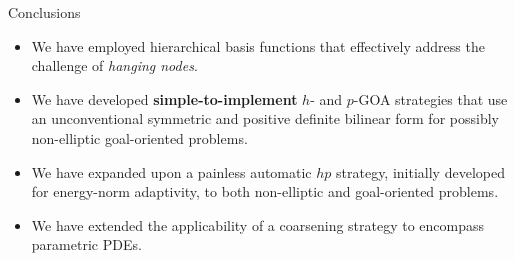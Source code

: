 \begin{frame}{Conclusions}

\begin{itemize}
\item We have employed hierarchical basis functions that effectively address the challenge of \emph{hanging nodes}.
\vspace{0.3cm}
\item We have developed \textbf{simple-to-implement} \( h \)- and \( p \)-GOA strategies that use an unconventional symmetric and positive definite bilinear form for possibly non-elliptic goal-oriented problems.
\vspace{0.3cm}
\item We have expanded upon a painless automatic \( hp \) strategy, initially developed for energy-norm adaptivity, to both non-elliptic and goal-oriented problems.
\vspace{0.3cm}
\item We have extended the applicability of a coarsening strategy to encompass parametric PDEs.
\vspace{0.3cm}
\end{itemize}

\end{frame}
